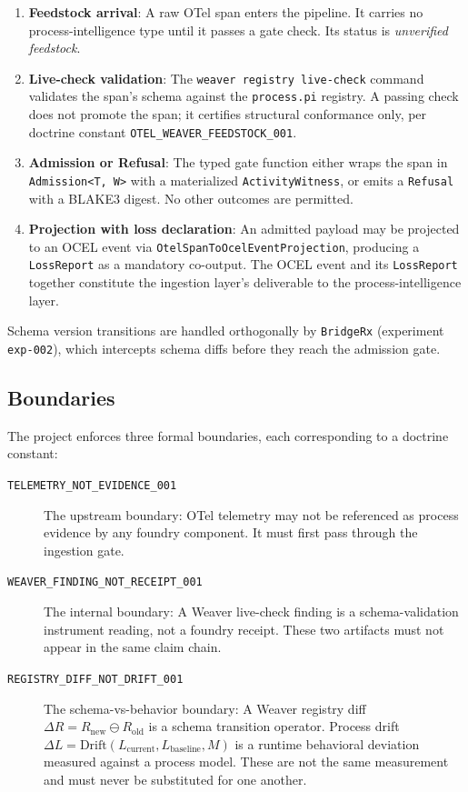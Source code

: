 \begin{enumerate}
  \item \textbf{Feedstock arrival}: A raw OTel span enters the pipeline. It carries no
    process-intelligence type until it passes a gate check. Its status is \emph{unverified feedstock}.
  \item \textbf{Live-check validation}: The \texttt{weaver registry live-check} command validates
    the span's schema against the \texttt{process.pi} registry. A passing check does not promote
    the span; it certifies structural conformance only, per doctrine constant
    \texttt{OTEL\_WEAVER\_FEEDSTOCK\_001}.
  \item \textbf{Admission or Refusal}: The typed gate function either wraps the span in
    \texttt{Admission<T,\,W>} with a materialized \texttt{ActivityWitness}, or emits a
    \texttt{Refusal} with a BLAKE3 digest. No other outcomes are permitted.
  \item \textbf{Projection with loss declaration}: An admitted payload may be projected to an
    OCEL event via \texttt{OtelSpanToOcelEventProjection}, producing a \texttt{LossReport}
    as a mandatory co-output. The OCEL event and its \texttt{LossReport} together constitute
    the ingestion layer's deliverable to the process-intelligence layer.
\end{enumerate}

Schema version transitions are handled orthogonally by \texttt{BridgeRx} (experiment
\texttt{exp-002}), which intercepts schema diffs before they reach the admission gate.

\subsection{Boundaries}
\label{sec:otel-weaver-arch-boundaries}

The project enforces three formal boundaries, each corresponding to a doctrine constant:

\begin{description}
  \item[\texttt{TELEMETRY\_NOT\_EVIDENCE\_001}] The upstream boundary: OTel telemetry may not
    be referenced as process evidence by any foundry component. It must first pass through the
    ingestion gate.
  \item[\texttt{WEAVER\_FINDING\_NOT\_RECEIPT\_001}] The internal boundary: A Weaver live-check
    finding is a schema-validation instrument reading, not a foundry receipt. These two artifacts
    must not appear in the same claim chain.
  \item[\texttt{REGISTRY\_DIFF\_NOT\_DRIFT\_001}] The schema-vs-behavior boundary: A Weaver
    registry diff $\Delta R = R_{\text{new}} \ominus R_{\text{old}}$ is a schema transition
    operator. Process drift $\Delta L = \text{Drift}(L_{\text{current}}, L_{\text{baseline}}, M)$
    is a runtime behavioral deviation measured against a process model. These are not the same
    measurement and must never be substituted for one another.
\end{description}

